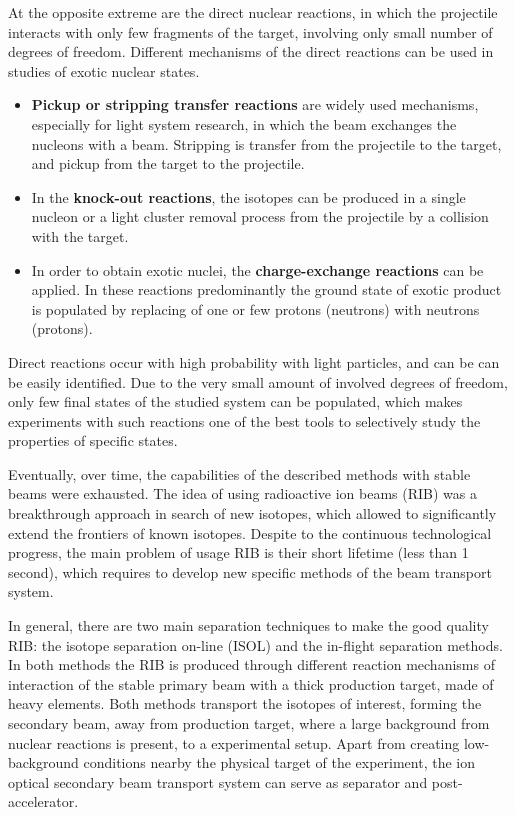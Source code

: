 At the opposite extreme are the direct nuclear reactions, in which the projectile interacts with only few fragments of the target, involving only small number of degrees of freedom.
Different mechanisms of the direct reactions can be used in studies of exotic nuclear states. 

\begin{itemize}
	
	\item 
	\textbf{Pickup or stripping transfer reactions} are widely used mechanisms, especially for light system research, in which the beam exchanges the nucleons with a beam. 
	Stripping is transfer from the projectile to the target, and pickup from the target to the projectile.
	
	\item
	In the \textbf{knock-out reactions}, the isotopes can be produced in a single nucleon or a light cluster removal process from the projectile by a collision with the target.
	
	\item
	In order to obtain exotic nuclei, the \textbf{charge-exchange reactions} can be applied.
	In these reactions predominantly  the ground state of exotic product is populated by replacing of one or few protons (neutrons) with neutrons (protons).
	
	
\end{itemize}	
Direct reactions occur with high probability with light particles, and can be can be easily identified.
Due to the very small amount of involved degrees of freedom, only few final states of the studied system can be populated, which makes experiments with such reactions one of the best tools to selectively study the properties of specific states.

Eventually, over time, the capabilities of the described methods with stable beams were exhausted.
The idea of using radioactive ion beams (RIB) was a breakthrough approach in search of new isotopes, which allowed to significantly extend the frontiers of known isotopes. 
Despite to the continuous technological progress, the main problem of usage RIB is their short lifetime (less than 1 second), which requires to develop new specific methods of the beam transport system.


In general, there are two main separation techniques to make the good quality RIB: the isotope separation on-line (ISOL) and the in-flight separation methods.
In both methods the RIB is produced through different reaction mechanisms of interaction of the stable primary beam with a thick production target, made of heavy elements.
Both methods transport the isotopes of interest, forming the secondary beam, away from production target, where a large background from nuclear reactions is present, to a experimental setup.
Apart from creating low-background conditions nearby the physical target of the experiment, the ion optical secondary beam transport system can serve as separator and post-accelerator.

